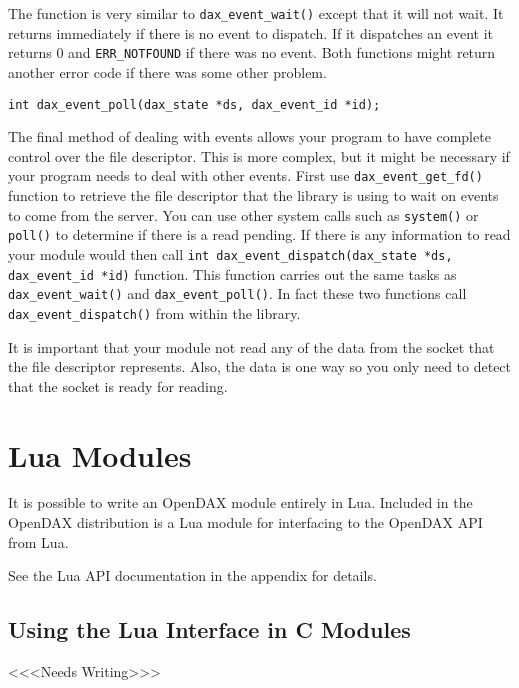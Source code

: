 The  function is very similar to \verb|dax_event_wait()| except that it will not wait.  It returns immediately if there is no event to dispatch.  If it dispatches an event it returns 0 and \verb|ERR_NOTFOUND| if there was no event.  Both functions might return another error code if there was some other problem.

\begin{verbatim}
int dax_event_poll(dax_state *ds, dax_event_id *id);
\end{verbatim}

The final method of dealing with events allows your program to have complete control over the file descriptor.  This is more complex, but it might be necessary if your program needs to deal with other events.  First use \texttt{dax\_event\_get\_fd()} function to retrieve the file descriptor that the library is using to wait on events to come from the server.  You can use other system calls such as \verb|system()| or \verb|poll()| to determine if there is a read pending.  If there is any information to read your module would then call \texttt{int dax\_event\_dispatch(dax\_state *ds, dax\_event\_id *id)} function.  This function carries out the same tasks as \texttt{dax\_event\_wait()} and \texttt{dax\_event\_poll()}.  In fact these two functions call \texttt{dax\_event\_dispatch()} from within the library.

It is important that your module not read any of the data from the socket that the file descriptor represents.  Also, the data is one way so you only need to detect that the socket is ready for reading.

\chapter{Lua Modules}

It is possible to write an OpenDAX module entirely in Lua.  Included in the OpenDAX distribution is a Lua module for interfacing to the OpenDAX API from Lua.

See the Lua API documentation in the appendix for details.

\section{Using the Lua Interface in C Modules}

<<<Needs Writing>>>

